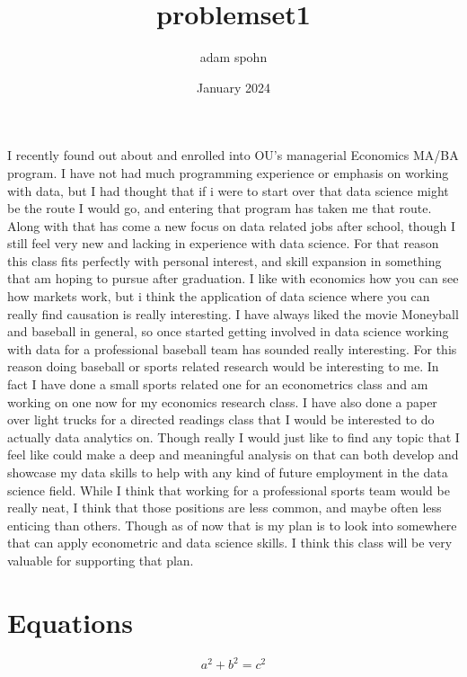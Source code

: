 \documentclass{article}
\title{problemset1}
\author{adam spohn}
\date{January 2024}
\begin{document}
\maketitle

    I recently found out about and enrolled into OU's managerial Economics MA/BA program. I have not had much programming experience or emphasis on working with data, but I had thought that if i were to start over that data science might be the route I would go, and entering that program has taken me that route. Along with that has come a new focus on data related jobs after school, though I still feel very new and lacking in experience with data science. For that reason this class fits perfectly with personal interest, and skill expansion in something that am hoping to pursue after graduation. I like with economics how you can see how markets work, but i think the application of data science where you can really find causation is really interesting. 
        I have always liked the movie Moneyball and baseball in general, so once started getting involved in data science working with data for a professional baseball team has sounded really interesting. For this reason doing baseball or sports related research would be interesting to me. In fact I have done a small sports related one for an econometrics class and am working on one now for my economics research class. I have also done a paper over light trucks for a directed readings class that I would be interested to do actually data analytics on. Though really I would just like to find any topic that I feel like could make a deep and meaningful analysis on that can both develop and showcase my data skills to help with any kind of future employment in the data science field. While I think that working for a professional sports team would be really neat, I think that those positions are less common, and maybe  often less enticing than others. Though as of now that is my plan is to look into somewhere that can apply econometric and data science skills. I think this class will be very valuable for supporting that plan. 

        \section {Equations}
        \[a^2 + b^2 = c^2\]
\end{document}
